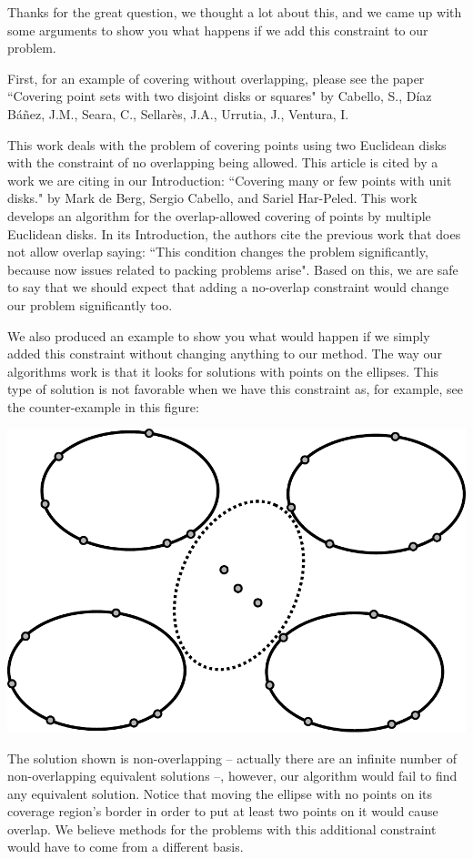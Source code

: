 		Thanks for the great question, we thought a lot about this, and we came up with some arguments to show you what happens if we add this constraint to our problem.
		
		First, for an example of covering without overlapping, please see the paper ``Covering point sets with two disjoint disks or squares" by Cabello, S., Díaz Báñez, J.M., Seara, C., Sellarès, J.A., Urrutia, J., Ventura, I.
		
		This work deals with the problem of covering points using two Euclidean disks with the constraint of no overlapping being allowed. This article is cited by a work we are citing in our Introduction: ``Covering many or few points with unit disks." by Mark de Berg, Sergio Cabello, and Sariel Har-Peled. 
		This work develops an algorithm for the overlap-allowed covering of points by multiple Euclidean disks. In its Introduction, the authors cite the previous work that does not allow overlap saying: ``This condition changes the problem significantly, because now issues related to packing problems arise". 
		Based on this, we are safe to say that we should expect that adding a no-overlap constraint would change our problem significantly too.
		
		We also produced an example to show you what would happen if we simply added this constraint without changing anything to our method. 
		The way our algorithms work is that it looks for solutions with points on the ellipses. This type of solution is not favorable when we have this constraint as, for example, see the counter-example in this figure:  

		\includegraphics[scale=.6]{figures/answer-to-reviewer-2}

		The solution shown is non-overlapping -- actually there are an infinite number of non-overlapping equivalent solutions --, however, our algorithm would fail to find any equivalent solution. Notice that moving the ellipse with no points on its coverage region's border in order to put at least two points on it would cause overlap.
		We believe methods for the problems with this additional constraint would have to come from a different basis.
		
		
